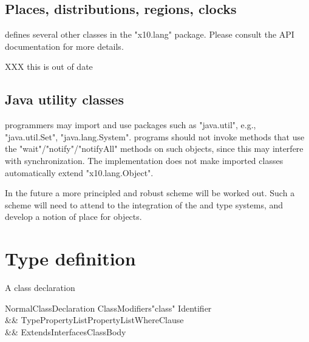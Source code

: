 
\subsection{Places, distributions, regions, clocks}
\Xten{} defines several other classes in the \xcd"x10.lang"
package. Please consult the API documentation for more details.

XXX this is out of date

\subsection{Java utility classes}
\XtenCurrVer{} programmers may import and use \java{} packages such as
\xcd"java.util", e.g., \xcd"java.util.Set", \xcd"java.lang.System".
\Xten{} programs should not invoke methods
that use the \xcd"wait"/\xcd"notify"/\xcd"notifyAll" methods on such objects,
since this may interfere with \Xten{} synchronization. The
implementation does not make imported \java{} classes
automatically extend \xcd"x10.lang.Object". 


In the future a more principled and robust scheme will be worked
out. Such a scheme will need to attend to the integration of the
\java{} and \Xten{} type systems, and develop a notion of place for 
\java{} objects.
\fi




\section{Type definition}\label{DepType:Class}

A class declaration 

\begin{grammar}
NormalClassDeclaration \: 
      ClassModifiers\opt \xcd"class" Identifier  \\
   && TypePropertyList\opt PropertyList\opt WhereClause\opt \\
   && Extends\opt Interfaces\opt ClassBody \\
\end{grammar}

